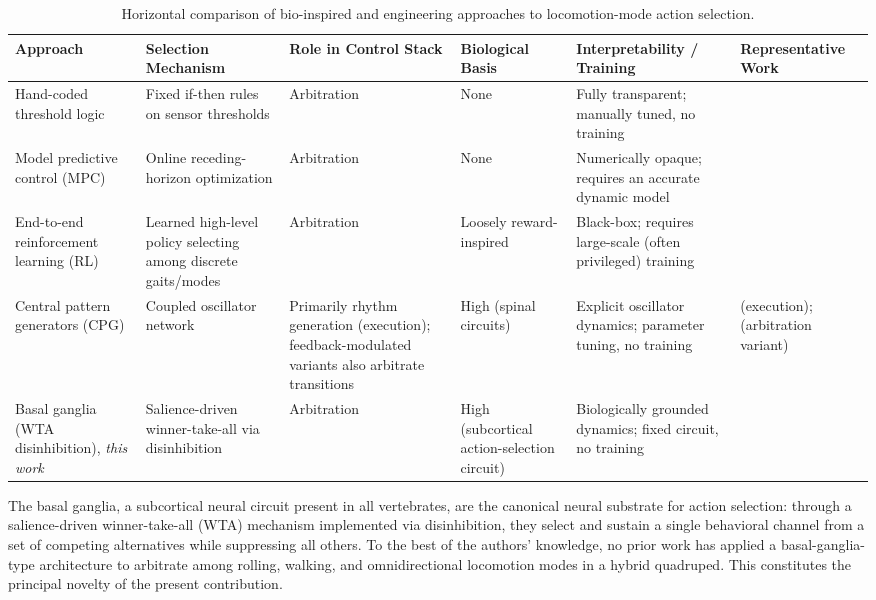 \begin{table}[t]
\centering
\caption{Horizontal comparison of bio-inspired and engineering approaches to locomotion-mode action selection.}
\footnotesize
\begin{tabular}{|p{2.1cm}|p{2.6cm}|p{1.9cm}|p{1.4cm}|p{2.4cm}|p{2.0cm}|}
\hline
\textbf{Approach} & \textbf{Selection Mechanism} & \textbf{Role in Control Stack} & \textbf{Biological Basis} & \textbf{Interpretability / Training} & \textbf{Representative Work} \\ \hline
Hand-coded threshold logic & Fixed if-then rules on sensor thresholds & Arbitration & None & Fully transparent; manually tuned, no training & \citet{Kashiri2019CENTAURO} \\ \hline
Model predictive control (MPC) & Online receding-horizon optimization & Arbitration & None & Numerically opaque; requires an accurate dynamic model & \citet{bjelonic2019,Bjelonic2022OfflineMotion} \\ \hline
End-to-end reinforcement learning (RL) & Learned high-level policy selecting among discrete gaits/modes & Arbitration & Loosely reward-inspired & Black-box; requires large-scale (often privileged) training & \citet{Yang2021GaitTransitions,Humphreys2025BioInspired} \\ \hline
Central pattern generators (CPG) & Coupled oscillator network & Primarily rhythm generation (execution); feedback-modulated variants also arbitrate transitions & High (spinal circuits) & Explicit oscillator dynamics; parameter tuning, no training & \citet{ijspeert2008,Bellegarda2022CPGRL,Manoonpong2013Neural} (execution); \citet{Fukui2019VestibularCPG,Owaki2017SpontaneousGait} (arbitration variant) \\ \hline
Basal ganglia (WTA disinhibition), \emph{this work} & Salience-driven winner-take-all via disinhibition & Arbitration & High (subcortical action-selection circuit) & Biologically grounded dynamics; fixed circuit, no training & \citet{Gurney2001a,Gurney2001b,Prescott2006Robot,Girard2003Basal,sarvestani2013computational,Baston2015Biologically,Prescott2024Simulated} \\ \hline
\end{tabular}
\label{table:action_selection_comparison}
\end{table}


The basal ganglia, a subcortical neural circuit present in all vertebrates, are the canonical neural substrate for action selection: through a salience-driven winner-take-all (WTA) mechanism implemented via disinhibition, they select and sustain a single behavioral channel from a set of competing alternatives while suppressing all others. To the best of the authors' knowledge, no prior work has applied a basal-ganglia-type architecture to arbitrate among rolling, walking, and omnidirectional locomotion modes in a hybrid quadruped. This constitutes the principal novelty of the present contribution.

